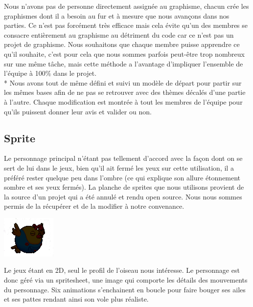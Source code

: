 \documentclass [11pt]{report}
\begin{document}
	\indent Nous n'avons pas de personne directement assignée au graphisme, chacun crée les graphismes dont il a besoin au fur et à mesure que nous avançons dans nos parties. Ce n'est pas forcément très efficace mais cela évite qu'un des membres se consacre entièrement au graphisme au détriment du code car ce n'est pas un projet de graphisme. Nous souhaitons que chaque membre puisse apprendre ce qu'il souhaite, c'est pour cela que nous sommes parfois peut-être trop nombreux sur une même tâche, mais cette méthode a l'avantage d'impliquer l'ensemble de l'équipe \`a 100\% dans le projet.\\*
	\indent Nous avons tout de même défini et suivi un modèle de départ pour partir sur les mêmes bases afin de ne pas se retrouver avec des thèmes décalés d'une partie à l'autre. Chaque modification est montrée à tout les membres de l'équipe pour qu'ils puissent donner leur avis et valider ou non.
	
	\vspace{15mm}
	
	\subsection {Sprite}
	Le personnage principal n'étant pas tellement d'accord avec la façon dont on se sert de lui dans le jeux, bien qu'il ait fermé les yeux sur cette utilisation, il a préféré rester quelque peu dans l'ombre (ce qui explique son allure étonnement sombre et ses yeux fermés).
	La planche de sprites que nous utilisons provient de la source d'un projet qui a été annulé et rendu open source. Nous nous sommes permis de la récupérer et de la modifier à notre convenance.
	
	\vspace{4mm}
		
		\begin{center}
		\includegraphics[scale=0.5]{images/bird.png}
		\end{center}
		
	\vspace{10mm}
		
	Le jeux étant en 2D, seul le profil de l'oiseau nous intéresse. Le personnage est donc géré via un spritesheet, une image qui comporte les détails des mouvements du personnage. Six animations s'enchainent en boucle pour faire bouger ses ailes et ses pattes rendant ainsi son vole plus réaliste.
	
\end{document}
